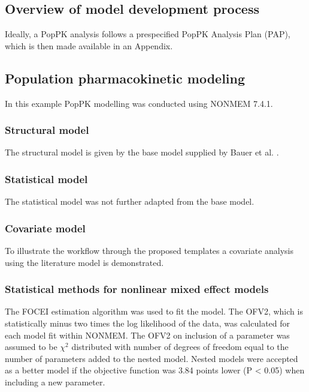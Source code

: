 \subsection{Overview of model development process}
Ideally, a PopPK analysis follows a prespecified PopPK Analysis Plan (PAP), which is then made available in an Appendix.

\subsection{Population pharmacokinetic modeling}

In this example PopPK modelling was conducted using \gls{NONMEM} 7.4.1.

\subsubsection{Structural model}

The structural model is given by the base model supplied by Bauer et al. \autocite{Bauer2019}.

\subsubsection{Statistical model}

The statistical model was not further adapted from the base model. 

\subsubsection{Covariate model}

To illustrate the workflow through the proposed templates a covariate analysis using the literature model is demonstrated. 

\subsubsection{Statistical methods for nonlinear mixed effect models}

The \gls{FOCEI} estimation algorithm was used to fit the model. The \gls{OFV2}, which is statistically minus two times the log likelihood of the data,  was calculated for each model fit within NONMEM. The \gls{OFV2} on inclusion of a parameter was assumed to be $\chi^{2}$ distributed with number of degrees of freedom equal to the number of parameters added to the nested model. Nested models were accepted as a better model if the objective function was 3.84 points lower (P < 0.05) when including a new parameter.

